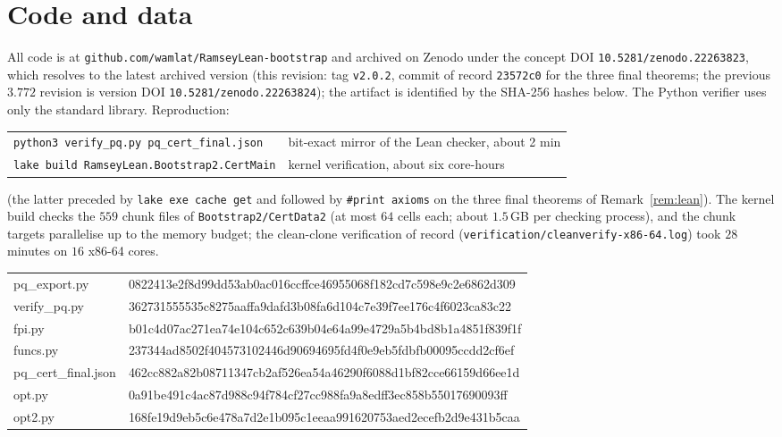 \documentclass[11pt]{article}
\theoremstyle{definition}
\begin{document}
\section*{Code and data}\label{sec:code}
All code is at \texttt{github.com/wamlat/RamseyLean-bootstrap} and archived on Zenodo under the concept DOI \texttt{10.5281/zenodo.22263823}, which resolves to the latest archived version (this revision: tag \texttt{v2.0.2}, commit of record \texttt{23572c0} for the three final theorems; the previous $3.772$ revision is version DOI \texttt{10.5281/zenodo.22263824}); the artifact is identified by the SHA-256 hashes below.  The Python verifier uses only the standard library.  Reproduction:
\begin{center}\small
\begin{tabular}{@{}ll@{}}
\texttt{python3 verify\_pq.py pq\_cert\_final.json} & bit-exact mirror of the Lean checker, about 2 min\\
\texttt{lake build RamseyLean.Bootstrap2.CertMain} & kernel verification, about six core-hours\\
\end{tabular}
\end{center}
(the latter preceded by \texttt{lake exe cache get} and followed by \texttt{\#print axioms} on the three final theorems of Remark~\ref{rem:lean}).  The kernel build checks the $559$ chunk files of \texttt{Bootstrap2/CertData2} (at most $64$ cells each; about $1.5$\,GB per checking process), and the chunk targets parallelise up to the memory budget; the clean-clone verification of record (\texttt{verification/cleanverify-x86-64.log}) took $28$ minutes on $16$ x86-64 cores.
\begin{center}\scriptsize\ttfamily
\begin{tabular}{@{}ll@{}}
pq\_export.py & 0822413e2f8d99dd53ab0ac016ccffce46955068f182cd7c598e9c2e6862d309\\
verify\_pq.py & 362731555535c8275aaffa9dafd3b08fa6d104c7e39f7ee176c4f6023ca83c22\\
fpi.py & b01c4d07ac271ea74e104c652c639b04e64a99e4729a5b4bd8b1a4851f839f1f\\
funcs.py & 237344ad8502f404573102446d90694695fd4f0e9eb5fdbfb00095ccdd2cf6ef\\
pq\_cert\_final.json & 462cc882a82b08711347cb2af526ea54a46290f6088d1bf82cce66159d66ee1d\\
opt.py & 0a91be491c4ac87d988c94f784cf27cc988fa9a8edff3ec858b55017690093ff\\
opt2.py & 168fe19d9eb5c6e478a7d2e1b095c1eeaa991620753aed2ecefb2d9e431b5caa\\
\end{tabular}
\end{center}
\end{document}

